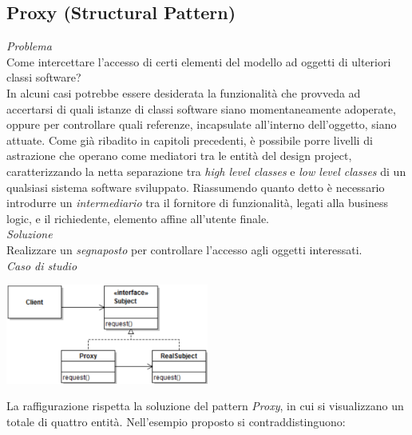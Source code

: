\documentclass{article}
\begin{document}
\subsection*{Proxy (Structural Pattern)}
\large
\textit{Problema}\\
Come intercettare l'accesso di certi elementi del modello ad oggetti di ulteriori classi software?\vspace*{14pt}\\
In alcuni casi potrebbe essere desiderata la funzionalità che provveda ad accertarsi di quali istanze di classi software siano momentaneamente adoperate, oppure per controllare quali referenze, incapsulate all'interno dell'oggetto, siano attuate. Come già ribadito in capitoli precedenti, è possibile porre livelli di astrazione che operano come mediatori tra le entità del design project, caratterizzando la netta separazione tra \textit{high level classes} e \textit{low level classes} di un qualsiasi sistema software sviluppato. Riassumendo quanto detto è necessario introdurre un \textit{intermediario} tra il fornitore di funzionalità, legati alla business logic, e il richiedente, elemento affine all'utente finale.\vspace*{14pt}\\
\textit{Soluzione}\\
Realizzare un \textit{segnaposto} per controllare l'accesso agli oggetti interessati.\vspace*{14pt}\\
\textit{Caso di studio}\\
\begin{center}
    \includegraphics[width=0.5\textwidth]{foto 1.png}
\end{center}
La raffigurazione rispetta la soluzione del pattern \textit{Proxy}, in cui si visualizzano un totale di quattro entità. Nell'esempio proposto si contraddistinguono:
\end{document}
